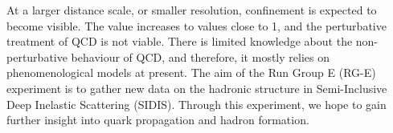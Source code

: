 At a larger distance scale, or smaller resolution, confinement is expected to become visible.
The \textalpha value increases to values close to 1, and the perturbative treatment of QCD is not viable.
There is limited knowledge about the non-perturbative behaviour of QCD, and therefore, it mostly relies on phenomenological models at present.
The aim of the Run Group E (RG-E) experiment is to gather new data on the hadronic structure in Semi-Inclusive Deep Inelastic Scattering (SIDIS).
Through this experiment, we hope to gain further insight into quark propagation and hadron formation.
